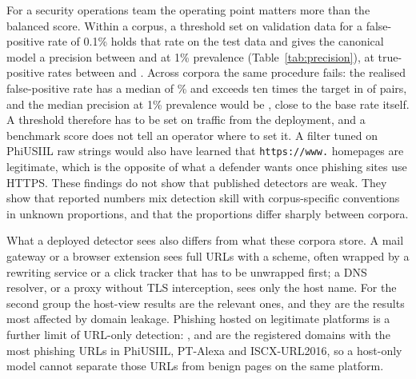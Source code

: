 For a security operations team the operating point matters more than the balanced score. Within a corpus, a threshold set on validation data for a false-positive rate of 0.1\% holds that rate on the test data and gives the canonical model a precision between \VPrecOneKaggleMUCharCanon{} and \VPrecOneISCXURLCharCanon{} at 1\% prevalence (Table~\ref{tab:precision}), at true-positive rates between \VTprKaggleMUCharCanon{} and \VTprISCXURLCharCanon. Across corpora the same procedure fails: the realised false-positive rate has a median of \XVFprCharCanon\% and exceeds ten times the target in \XVOverTenCharCanon{} of \XVNPairsCharCanon{} pairs, and the median precision at 1\% prevalence would be \XVPrecOneCharCanon, close to the base rate itself. A threshold therefore has to be set on traffic from the deployment, and a benchmark score does not tell an operator where to set it. A filter tuned on PhiUSIIL raw strings would also have learned that \texttt{https://www.} homepages are legitimate, which is the opposite of what a defender wants once phishing sites use HTTPS. These findings do not show that published detectors are weak. They show that reported numbers mix detection skill with corpus-specific conventions in unknown proportions, and that the proportions differ sharply between corpora.

What a deployed detector sees also differs from what these corpora store. A mail gateway or a browser extension sees full URLs with a scheme, often wrapped by a rewriting service or a click tracker that has to be unwrapped first; a DNS resolver, or a proxy without TLS interception, sees only the host name. For the second group the host-view results are the relevant ones, and they are the results most affected by domain leakage. Phishing hosted on legitimate platforms is a further limit of URL-only detection: \texttt{\LargestPhishPhiUSIIL}, \texttt{\LargestPhishPTAlexa} and \texttt{\LargestPhishISCXURL} are the registered domains with the most phishing URLs in PhiUSIIL, PT-Alexa and ISCX-URL2016, so a host-only model cannot separate those URLs from benign pages on the same platform.
